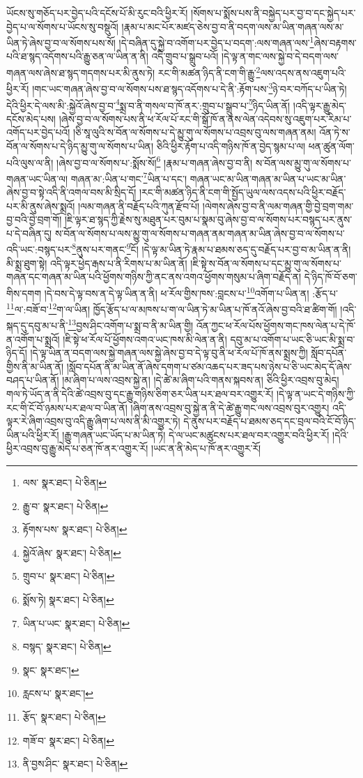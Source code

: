 ཡོངས་སུ་གཅོད་པར་བྱེད་པའི་དངོས་པོ་མི་རུང་བའི་ཕྱིར་རོ། །སོགས་པ་སྨོས་པས་ནི་བསྐྱེད་པར་བྱ་བ་དང་སྐྱེད་པར་བྱེད་པ་ལ་སོགས་པ་ཡོངས་སུ་བསྡུའོ། །རྣམ་པ་མང་པོར་མཛད་ཅེས་བྱ་བ་ནི་བདག་ལས་མ་ཡིན་གཞན་ལས་མ་ཡིན་ཏེ་ཞེས་བྱ་བ་ལ་སོགས་པས་སོ། །དེ་བཞིན་དུ་སྐྱེ་བ་འགོག་པར་བྱེད་པ་བདག་:ལས་གཞན་ལས་\footnote{ལས་  སྣར་ཐང་།  པེ་ཅིན། }ཞེས་བརྟགས་པའི་ཐ་སྙད་འདོགས་པའི་རྒྱུ་ཅན་ལ་ཡིན་ན་ནི། འདི་གྲུབ་པ་སྒྲུབ་པའོ། །དེ་ལྟ་ན་གང་ལས་སྐྱེ་བ་དེ་བདག་ལས་གཞན་ལས་ཞེས་ཐ་སྙད་གདགས་པར་མི་ནུས་ཏེ། རང་གི་མཚན་ཉིད་ནི་ངག་གི་རྒྱུ་\footnote{རྒྱུ་བ་  སྣར་ཐང་།  པེ་ཅིན། }ལས་འདས་ནས་འཇུག་པའི་ཕྱིར་རོ། །གང་ཡང་གཞན་ཞེས་བྱ་བ་ལ་སོགས་པས་ཐ་སྙད་འདོགས་པ་དེ་ནི་:རྟོག་པས་\footnote{རྟོགས་པས་  སྣར་ཐང་།  པེ་ཅིན། }ཉེ་བར་བཀོད་པ་ཡིན་ཏེ། དེའི་ཕྱིར་དེ་ལས་མི་:སྐྱེའོ་ཞེས་བྱ་བ་\footnote{སྐྱེའོ་ཞེས་  སྣར་ཐང་།  པེ་ཅིན། }སྨྲ་བ་ནི་གསལ་བ་ཁོ་ནར་:གྲུབ་པ་སྒྲུབ་པ་\footnote{གྲུབ་པ་  སྣར་ཐང་།  པེ་ཅིན། }ཉིད་ཡིན་ནོ། །འདི་ལྟར་རྒྱུ་མེད་དངོས་མེད་པས། །ཞེས་བྱ་བ་ལ་སོགས་པས་ནི་ཕ་རོལ་པོ་རང་གི་སྒོ་ཁོ་ན་ནས་ལེན་འདེབས་སུ་འཇུག་པར་རིམ་པ་འགོད་པར་བྱེད་པའོ། །ཅི་སཱ་ལུའི་ས་བོན་ལ་སོགས་པ་དེ་མྱུ་གུ་ལ་སོགས་པ་འབྲས་བུ་ལས་གཞན་ནམ། འོན་ཏེ་ས་བོན་ལ་སོགས་པ་དེ་ཉིད་མྱུ་གུ་ལ་སོགས་པ་ཡིན། ཅིའི་ཕྱིར་རྟོག་པ་འདི་གཉིས་ཁོ་ན་བྱེད་སྙམ་པ་ལ། ཕན་ཚུན་ལོག་པའི་ལུས་ལ་ནི། །ཞེས་བྱ་བ་ལ་སོགས་པ་:སྨོས་སོ།\footnote{སྨོས་ཏེ།  སྣར་ཐང་།  པེ་ཅིན། } །རྣམ་པ་གཞན་ཞེས་བྱ་བ་ནི། ས་བོན་ལས་མྱུ་གུ་ལ་སོགས་པ་གཞན་ཡང་ཡིན་ལ། གཞན་མ་:ཡིན་པ་གང་\footnote{ཡིན་པ་ཡང་  སྣར་ཐང་།  པེ་ཅིན། }ཡིན་པ་དང་། གཞན་ཡང་མ་ཡིན་གཞན་མ་ཡིན་པ་ཡང་མ་ཡིན་ཞེས་བྱ་བ་སྟེ་འདི་ནི་འགལ་བས་མི་སྲིད་དོ། །རང་གི་མཚན་ཉིད་ནི་ངག་གི་སྤྱོད་ཡུལ་ལས་འདས་པའི་ཕྱིར་བརྗོད་པར་མི་ནུས་ཞེས་སྨྲའོ། །ལམ་གཞན་ནི་བརྗོད་པའི་ཀུན་རྫོབ་པོ། །ལེགས་ཞེས་བྱ་བ་ནི་ལམ་གཞན་གྱི་བྱེ་བྲག་གམ་བྱ་བའི་བྱེ་བྲག་གོ། །ཇི་ལྟར་ཐ་སྙད་ཀྱི་རྗེས་སུ་མཐུན་པར་བུམ་པ་སྣམ་བུ་ཞེས་བྱ་བ་ལ་སོགས་པར་བསྙད་པར་ནུས་པ་དེ་བཞིན་དུ། ས་བོན་ལ་སོགས་པ་ལས་མྱུ་གུ་ལ་སོགས་པ་གཞན་ནམ་གཞན་མ་ཡིན་ཞེས་བྱ་བ་ལ་སོགས་པ་འདི་ཡང་:བསྙད་པར་\footnote{བསྙད་  སྣར་ཐང་།  པེ་ཅིན། }ནུས་པར་གནང་\footnote{སྣང་  སྣར་ཐང་། }ངོ། །དེ་ལྟ་མ་ཡིན་ཏེ་རྣམ་པ་ཐམས་ཅད་དུ་བརྗོད་པར་བྱ་བ་མ་ཡིན་ན་ནི། མི་སྨྲ་ཐུག་སྟེ། འདི་ལྟར་ཕྱེད་རྒས་པ་ནི་རིགས་པ་མ་ཡིན་ནོ། །ཇི་སྟེ་ས་བོན་ལ་སོགས་པ་དང་མྱུ་གུ་ལ་སོགས་པ་གཞན་དང་གཞན་མ་ཡིན་པའི་ཕྱོགས་གཉིས་ཀྱི་ནང་ནས་འགའ་ཕྱོགས་གསུམ་པ་ཞིག་བརྗོད་ན། དེ་ཉིད་ཁོ་བོ་ཅག་གིས་དགག །དེ་བས་དེ་ལྟ་བས་ན་དེ་ལྟ་ཡིན་ན་ནི། ཕ་རོལ་གྱིས་ཁས་:བླངས་པ་\footnote{རླངས་པ་  སྣར་ཐང་། }འགོག་པ་ཡིན་ན། :རྩོད་པ་\footnote{རྩོད་  སྣར་ཐང་།  པེ་ཅིན། }ལ་:བཟོ་བ་\footnote{གཟོ་བ་  སྣར་ཐང་།  པེ་ཅིན། }ག་ལ་ཡིན། ཁྱོད་རྩོད་པ་ལ་མཁས་པ་ག་ལ་ཡིན་ཏེ་མ་ཡིན་པ་ཁོ་ནའོ་ཞེས་བྱ་བའི་ཐ་ཚིག་གོ། །འདི་སྐད་དུ་དབུ་མ་པ་ནི་\footnote{ནི་བྱས་ཤིང་  སྣར་ཐང་།  པེ་ཅིན། }བྱས་ཤིང་འགོག་པ་སྨྲ་བ་ནི་མ་ཡིན་གྱི། འོན་ཀྱང་ཕ་རོལ་པོས་ཕྱོགས་གང་ཁས་ལེན་པ་དེ་ཁོ་ན་འགོག་པ་སྨྲའོ། །ཇི་སྟེ་ཕ་རོལ་པོ་ཕྱོགས་འགའ་ཡང་ཁས་མི་ལེན་ན་ནི། དབུ་མ་པ་འགོག་པ་ཡང་ཅི་ཡང་མི་སྨྲ་བ་ཉིད་དོ། །དེ་ལྟ་ཡིན་ན་བདག་ལས་སྐྱེ་གཞན་ལས་སྐྱེ་ཞེས་བྱ་བ་དེ་ལྟ་བུ་ནི་ཕ་རོལ་པོ་ཁོ་ནས་སྨྲས་ཀྱི། སློབ་དཔོན་གྱིས་ནི་མ་ཡིན་ནོ། །སློབ་དཔོན་ནི་མ་ཡིན་ནོ་ཞེས་དགག་པ་ཙམ་འཆད་པར་ཟད་པས་ཉེས་པ་ཅི་ཡང་མེད་དོ་ཞེས་བཤད་པ་ཡིན་ནོ། །མ་ཞིག་པ་ལས་འབྲས་སྐྱེ་ན། །དེ་ཚེ་མ་ཞིག་པའི་གནས་སྐབས་ན། ཅིའི་ཕྱིར་འབྲས་བུ་མེད། གལ་ཏེ་ཡོད་ན་ནི་དེའི་ཚེ་འབྲས་བུ་དང་རྒྱུ་གཉིས་ཅིག་ཅར་ཡིན་པར་ཐལ་བར་འགྱུར་རོ། །དེ་ལྟ་ན་ཡང་དེ་གཉིས་ཀྱི་རང་གི་ངོ་བོ་ཉམས་པར་ཐལ་བ་ཡིན་ནོ། །ཞིག་ནས་འབྲས་བུ་སྐྱེ་ན་ནི་དེ་ཚེ་རྒྱུ་གང་ལས་འབྲས་བུར་འགྱུར། འདི་ལྟར་རེ་ཞིག་འབྲས་བུ་འདི་རྒྱུ་ཞིག་པ་ལས་ནི་མི་འགྱུར་ཏེ། དེ་ནུས་པར་བརྗོད་པ་ཐམས་ཅད་དང་བྲལ་བའི་ངོ་བོ་ཉིད་ཡིན་པའི་ཕྱིར་རོ། །རྒྱུ་གཞན་ཡང་ཡོད་པ་མ་ཡིན་ཏེ། དེ་ལ་ཡང་མཚུངས་པར་ཐལ་བར་འགྱུར་བའི་ཕྱིར་རོ། །དེའི་ཕྱིར་འབྲས་བུ་རྒྱུ་མེད་པ་ཅན་ཁོ་ནར་འགྱུར་རོ། །ཡང་ན་ནི་མེད་པ་ཁོ་ནར་འགྱུར་རོ། 